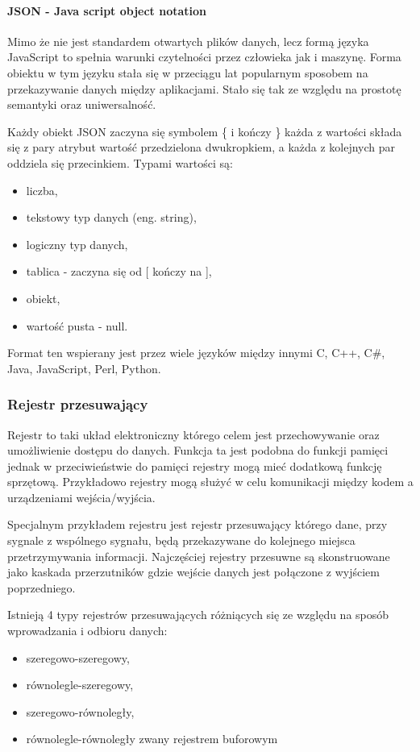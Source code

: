 \paragraph{JSON -  Java script object notation}

Mimo że nie jest standardem otwartych plików danych, lecz formą języka JavaScript to spełnia warunki czytelności przez człowieka jak i maszynę. 
Forma obiektu w tym języku stała się w przeciągu lat popularnym sposobem na przekazywanie danych między aplikacjami. Stało się tak ze względu na prostotę semantyki oraz uniwersalność. 

Każdy obiekt JSON zaczyna się symbolem \{ i kończy \} każda z wartości składa się z pary atrybut wartość przedzielona dwukropkiem, a każda z kolejnych par oddziela się przecinkiem. Typami wartości są:
\begin{itemize}
        \item liczba, 
        \item tekstowy typ danych (eng. string),
        \item logiczny typ danych,
        \item tablica - zaczyna się od [ kończy na ],
        \item obiekt,
        \item wartość pusta - null. 
\end{itemize}

Format ten wspierany jest przez wiele języków między innymi C, C++, C\#, Java, JavaScript, Perl, Python\cite{json}.

\subsubsection{Rejestr przesuwający}
Rejestr to taki układ elektroniczny którego celem jest przechowywanie oraz umożliwienie dostępu do danych. Funkcja ta jest podobna do funkcji pamięci jednak w przeciwieństwie do pamięci rejestry mogą mieć dodatkową funkcję sprzętową.
Przykładowo rejestry mogą służyć w celu komunikacji między kodem a urządzeniami wejścia/wyjścia.

Specjalnym przykładem rejestru jest rejestr przesuwający którego dane, przy sygnale z wspólnego sygnału, będą przekazywane do kolejnego miejsca przetrzymywania informacji. 
Najczęściej rejestry przesuwne są skonstruowane jako kaskada przerzutników gdzie wejście danych jest połączone z wyjściem poprzedniego.

Istnieją 4 typy rejestrów przesuwających różniących się ze względu na sposób wprowadzania i odbioru danych:
\begin{itemize}
        \item szeregowo-szeregowy,
        \item równolegle-szeregowy,
        \item szeregowo-równoległy,
        \item równolegle-równoległy zwany rejestrem buforowym  
\end{itemize} 
